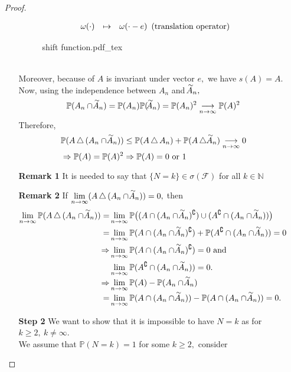 \documentclass[12pt,a4paper]{report}
\theoremstyle{definition}
\newcommand{\oversim}[1]{\parbox[t][-18pt][c]{10pt}{\scriptsize$\sim$}\hspace*{-12pt}{#1}}
\newcommand{\incfig}[1]{%
{#1.pdf_tex}
}
\begin{document}
\begin{enumerate}
\begin{proof}
\begin{enumerate}
\[\begin{array}[c]{rcl}
		\omega(\cdot) & \mapsto & \omega(\cdot-e)
		\end{array}(\mbox{translation operator})
		\]
		\begin{figure}[htp]
		\centering
		\def\svgwidth{10cm}
		\incfig{shift function}
		\end{figure}
		\\
		Moreover, because of $A$ is invariant under vector $e,$ we have $s(A)=A.$ Now, using the independence between $A_n$ and $\oversim{A}_n,$
		\[
		\mathbb{P}(A_n\cap\oversim{A}_n)=\mathbb{P}(A_n)\mathbb{P}(\oversim{A}_n)=\mathbb{P}(A_n)^2\underset{n\to\infty}{\longrightarrow}\mathbb{P}(A)^2
		\]
		Therefore,
		\begin{align*}
		&\mathbb{P}(A\,\triangle\, (A_n\cap \oversim{A}_n))\leq \mathbb{P}(A\,\triangle\, A_n)+\mathbb{P}(A\,\triangle\, \oversim{A}_n)\underset{n\to\infty}{\longrightarrow}0\\
		&\Rightarrow \mathbb{P}(A)=\mathbb{P}(A)^2\Rightarrow \mathbb{P}(A)=0\mbox{ or }1
		\end{align*}
		\item[\textbf{Remark 1}] It is needed to say that $\{N=k\}\in \sigma(\mathcal{F})$ for all $k\in\mathbb{N}$
		\item[\textbf{Remark 2}] If $\lim\limits_{n\to\infty}(A\,\triangle\,(A_n\cap\oversim{A}_n))=0,$ then
		\begin{align*}
		\lim_{n\to\infty}\mathbb{P}(A\, \triangle \, (A_n\cap\oversim{A}_n))=&\lim_{n\to\infty}\mathbb{P}\big((A\cap(A_n\cap\oversim{A}_n)^\complement)\cup (A^\complement\cap(A_n\cap\oversim{A}_n))\big)\\
		=&\lim_{n\to\infty}\mathbb{P}(A\cap(A_n\cap\oversim{A}_n)^\complement)+\mathbb{P} (A^\complement\cap(A_n\cap\oversim{A}_n))=0\\
		\Rightarrow & \lim_{n\to\infty}\mathbb{P}(A\cap(A_n\cap\oversim{A}_n)^\complement)=0 \mbox{ and }\\
		 &\lim_{n\to\infty}\mathbb{P} (A^\complement\cap(A_n\cap\oversim{A}_n))=0.\\
		\Rightarrow & \lim_{n\to\infty}\mathbb{P}(A)-\mathbb{P}(A_n\cap\oversim{A}_n)\\
		= & \lim_{n\to\infty}\mathbb{P}(A\cap(A_n\cap\oversim{A}_n))-\mathbb{P}(A\cap (A_n\cap\oversim{A}_n))=0.
		\end{align*}
		\item[\textbf{Step 2}] We want to show that it is impossible to have $N=k$ as for $k\geq 2,\ k\neq \infty.$ \\
		We assume that $\mathbb{P}(N=k)=1$ for some $k\geq 2,$ consider 

\end{enumerate}
\end{proof}
\end{enumerate}
\end{document}
